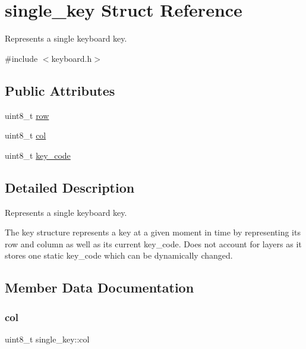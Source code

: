 \hypertarget{structsingle__key}{}\section{single\+\_\+key Struct Reference}
\label{structsingle__key}


Represents a single keyboard key.  




{\ttfamily \#include $<$keyboard.\+h$>$}

\subsection*{Public Attributes}
\begin{DoxyCompactItemize}
\item 
uint8\+\_\+t \hyperlink{structsingle__key_a86c0464140fe262bd1f0271a95885733}{row}
\item 
uint8\+\_\+t \hyperlink{structsingle__key_a246a23103a0616c1c92fee6c921d6cf6}{col}
\item 
uint8\+\_\+t \hyperlink{structsingle__key_ac1f4dc4c4e1eb4455cf143c9eac37f13}{key\+\_\+code}
\end{DoxyCompactItemize}


\subsection{Detailed Description}
Represents a single keyboard key. 

The key structure represents a key at a given moment in time by representing its row and column as well as its current key\+\_\+code. Does not account for layers as it stores one static key\+\_\+code which can be dynamically changed. 

\subsection{Member Data Documentation}
\mbox{\label{structsingle__key_a246a23103a0616c1c92fee6c921d6cf6}} 
\subsubsection{\texorpdfstring{col}{col}}
{\footnotesize\ttfamily uint8\+\_\+t single\+\_\+key\+::col}

\mbox{\label{structsingle__key_ac1f4dc4c4e1eb4455cf143c9eac37f13}} 
